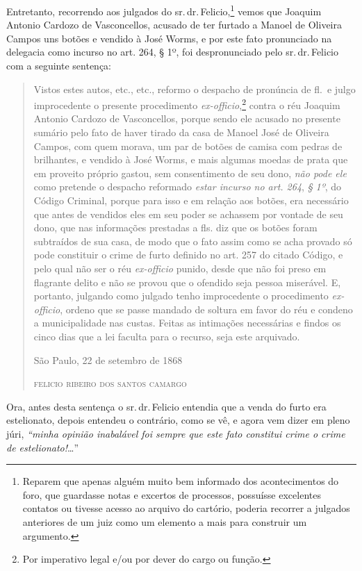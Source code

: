 Entretanto, recorrendo aos julgados do sr.\,dr.\,Felicio,\footnote{
  Reparem que apenas alguém muito bem informado dos acontecimentos do
  foro, que guardasse notas e excertos de processos, possuísse
  excelentes contatos ou tivesse acesso ao arquivo do cartório, poderia
  recorrer a julgados anteriores de um juiz como um elemento a mais para
  construir um argumento.} vemos que Joaquim Antonio Cardozo de
Vasconcellos, acusado de ter furtado a Manoel de Oliveira Campos uns
botões e vendido à José Worms, e por este fato pronunciado na delegacia
como incurso no art. 264, § 1º, foi despronunciado pelo sr.\,dr.\,Felicio
com a seguinte sentença:

\begin{quote}
Vistos estes autos, etc., etc., reformo o despacho de pronúncia de
fl.~e julgo improcedente o presente procedimento
\emph{ex-officio},\footnote{ Por imperativo legal e/ou por dever do
  cargo ou função.} contra o réu Joaquim Antonio Cardozo de
Vasconcellos, porque sendo ele acusado no presente sumário pelo fato de
haver tirado da casa de Manoel José de Oliveira Campos, com quem morava,
um par de botões de camisa com pedras de brilhantes, e vendido à José
Worms, e mais algumas moedas de prata que em proveito próprio gastou,
sem consentimento de seu dono, \emph{não pode ele} como pretende o
despacho reformado \emph{estar incurso no art. 264}, \emph{§ 1º}, do
Código Criminal, porque para isso e em relação aos botões, era
necessário que antes de vendidos eles em seu poder se achassem por
vontade de seu dono, que nas informações prestadas a fls. diz que os
botões foram subtraídos de sua casa, de modo que o fato assim como se
acha provado só pode constituir o crime de furto definido no art. 257 do
citado Código, e pelo qual não ser o réu \emph{ex-officio} punido, desde
que não foi preso em flagrante delito e não se provou que o ofendido
seja pessoa miserável. E, portanto, julgando como julgado tenho
improcedente o procedimento \emph{ex-officio}, ordeno que se passe
mandado de soltura em favor do réu e condeno a municipalidade nas
custas. Feitas as intimações necessárias e findos os cinco dias que a
lei faculta para o recurso, seja este arquivado.

\begin{flushright}
São Paulo, 22 de setembro de 1868

\textsc{felicio ribeiro dos santos camargo}
\end{flushright}
\end{quote}

Ora, antes desta sentença o sr.\,dr.\,Felicio entendia que a venda do
furto era estelionato, depois entendeu o contrário, como se vê, e agora
vem dizer em pleno júri, \emph{``minha opinião inabalável foi sempre que
este fato constitui crime o crime de estelionato!}\ldots{}''

